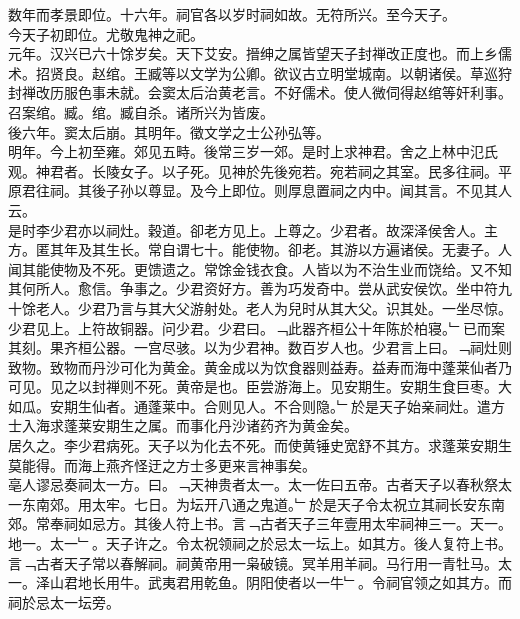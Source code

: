 \documentclass{zhvt-classic}
\begin{document}
\hspace*{2em}数年而孝景即位。十六年。祠官各以岁时祠如故。无符所兴。至今天子。\\
\hspace*{2em}今天子初即位。尤敬鬼神之祀。\\
\hspace*{2em}元年。汉兴已六十馀岁矣。天下艾安。搢绅之属皆望天子封禅改正度也。而上乡儒术。招贤良。赵绾。王臧等以文学为公卿。欲议古立明堂城南。以朝诸侯。草巡狩封禅改历服色事未就。会窦太后治黄老言。不好儒术。使人微伺得赵绾等奸利事。召案绾。臧。绾。臧自杀。诸所兴为皆废。\\
\hspace*{2em}後六年。窦太后崩。其明年。徵文学之士公孙弘等。\\
\hspace*{2em}明年。今上初至雍。郊见五畤。後常三岁一郊。是时上求神君。舍之上林中氾氏观。神君者。长陵女子。以子死。见神於先後宛若。宛若祠之其室。民多往祠。平原君往祠。其後子孙以尊显。及今上即位。则厚息置祠之内中。闻其言。不见其人云。\\
\hspace*{2em}是时李少君亦以祠灶。穀道。卻老方见上。上尊之。少君者。故深泽侯舍人。主方。匿其年及其生长。常自谓七十。能使物。卻老。其游以方遍诸侯。无妻子。人闻其能使物及不死。更馈遗之。常馀金钱衣食。人皆以为不治生业而饶给。又不知其何所人。愈信。争事之。少君资好方。善为巧发奇中。尝从武安侯饮。坐中符九十馀老人。少君乃言与其大父游射处。老人为兒时从其大父。识其处。一坐尽惊。少君见上。上符故铜器。问少君。少君曰。﹁此器齐桓公十年陈於柏寝。﹂已而案其刻。果齐桓公器。一宫尽骇。以为少君神。数百岁人也。少君言上曰。﹁祠灶则致物。致物而丹沙可化为黄金。黄金成以为饮食器则益寿。益寿而海中蓬莱仙者乃可见。见之以封禅则不死。黄帝是也。臣尝游海上。见安期生。安期生食巨枣。大如瓜。安期生仙者。通蓬莱中。合则见人。不合则隐。﹂於是天子始亲祠灶。遣方士入海求蓬莱安期生之属。而事化丹沙诸药齐为黄金矣。\\
\hspace*{2em}居久之。李少君病死。天子以为化去不死。而使黄锤史宽舒不其方。求蓬莱安期生莫能得。而海上燕齐怪迂之方士多更来言神事矣。\\
\hspace*{2em}亳人谬忌奏祠太一方。曰。﹁天神贵者太一。太一佐曰五帝。古者天子以春秋祭太一东南郊。用太牢。七日。为坛开八通之鬼道。﹂於是天子令太祝立其祠长安东南郊。常奉祠如忌方。其後人符上书。言﹁古者天子三年壹用太牢祠神三一。天一。地一。太一﹂。天子许之。令太祝领祠之於忌太一坛上。如其方。後人复符上书。言﹁古者天子常以春解祠。祠黄帝用一枭破镜。冥羊用羊祠。马行用一青牡马。太一。泽山君地长用牛。武夷君用乾鱼。阴阳使者以一牛﹂。令祠官领之如其方。而祠於忌太一坛旁。\\
\end{document}
